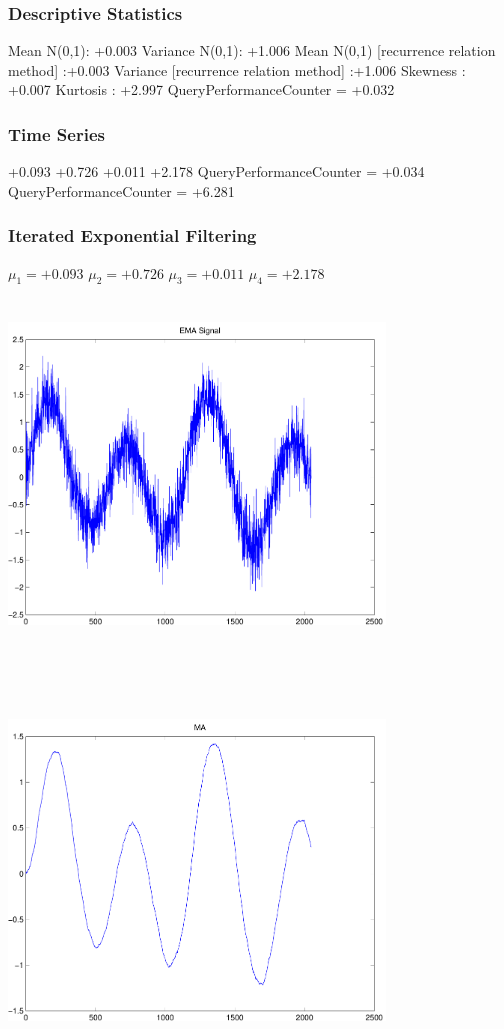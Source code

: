 \documentclass[9pt]{article}
\theoremstyle{plain}
\theoremstyle{definition}
\theoremstyle{remark}
\numberwithin{equation}{section}
\begin{document}
\subsubsection{Descriptive Statistics}
Mean N(0,1): +0.003
Variance N(0,1): +1.006
Mean N(0,1) [recurrence relation method] :+0.003
Variance [recurrence relation method] :+1.006
Skewness : +0.007
Kurtosis : +2.997
QueryPerformanceCounter  =  +0.032
\subsubsection{Time Series }
+0.093
+0.726
+0.011
+2.178
QueryPerformanceCounter  =  +0.034
QueryPerformanceCounter  =  +6.281
\subsubsection{Iterated Exponential Filtering }
$\mu_1 =+0.093$
$\mu_2 =+0.726$
$\mu_3 =+0.011$
$\mu_4 =+2.178$
\includegraphics[width=10.0cm,height=10.0cm]{EMA_signal.pdf}

\includegraphics[width=10.0cm,height=10.0cm]{MA.pdf}
\end{document}
